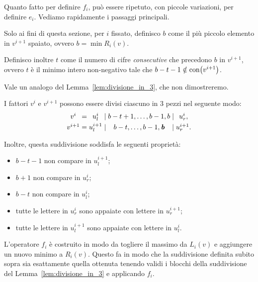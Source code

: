 Quanto fatto per definire $f_i$, pu\`o essere ripetuto, con piccole variazioni, per definire
$e_i$.
Vediamo rapidamente i passaggi principali.

\begin{definition}
    \label{def:b_t}
    Solo ai fini di questa sezione, per $i$ fissato, definisco $b$ come il pi\`u 
    piccolo elemento in $v^{i+1}$ spaiato,
    ovvero $b = \min R_i (v)$.

    Definisco inoltre $t$ come il numero di cifre \emph{consecutive} che 
    precedono $b$ in $v^{i+1}$, ovvero $t$ \`e il minimo intero non-negativo tale che
    $ b-t-1 \notin \operatorname{con}\bigl(v^{i+1}\bigr)$.
\end{definition}


Vale un analogo del Lemma~\ref{lem:divisione_in_3}, che non dimostreremo.

\begin{lemma}
    \label{lem:divisione_in_3_pt2}
    I fattori $v^i$ e $v^{i+1}$ possono essere divisi ciascuno in 3 pezzi nel seguente
    modo:
    \[
        \begin{array}{c@{\;}c@{\;}c@{\;}c@{\;}c@{\;}c@{\;}c}
            v^i &=& u^i_l &\mid&  b-t+1,  \dots, b-1, b  &\mid& u^i_r ,  
            \\[\jot]
            v^{i+1} &=& u^{i+1}_l &\mid&  b-t, \dots, b-1, \textbf{\em b} &\mid& u^{i+1}_r.
        \end{array}
    \]

    Inoltre, questa suddivisione soddisfa le seguenti propriet\`a:
    \begin{itemize}
        \item $b-t-1$ non compare in $u^{i+1}_l$;
        \item $b+1$ non compare in $u^i_r$;
        \item $b-t$ non compare in $u^i_l$;
        \item tutte le lettere in $u^i_r$ sono appaiate con lettere in $u^{i+1}_r$;
        \item tutte le lettere in $u^{i+1}_l$ sono appaiate con lettere in $u^i_l$.
    \end{itemize}
\end{lemma}


\begin{remark}
    L'operatore $f_i$ \`e costruito in modo da togliere il massimo
    da $L_i(v)$ e aggiungere un nuovo minimo a $R_i(v)$.
    Questo fa in modo che la suddivisione definita subito sopra sia esattamente
    quella ottenuta tenendo validi i blocchi della suddivisione del
    Lemma~\ref{lem:divisione_in_3} e applicando $f_i$.
\end{remark}
    

